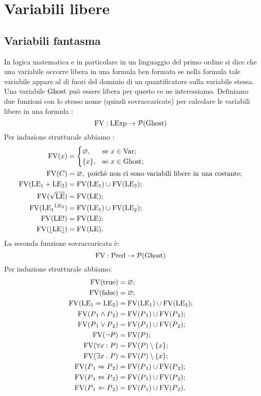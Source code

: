 \documentclass[a4paper, 12pt, oneside,fleqn]{book}
\begin{document}
\chapter{Variabili libere}
\section{Variabili fantasma}
In logica matematica e in particolare in un linguaggio del primo ordine si dice che una variabile occorre libera in una formula ben formata se nella formula tale variabile appare al di fuori del dominio di un quantificatore sulla variabile stessa. Una variabile $\mathrm{Ghost}$ può essere libera per questo ce ne interessiamo.
Definiamo due funzioni con lo stesso nome (quindi sovraccaricate) per calcolare le variabili libere in una formula :
$$\mathrm{FV}\mathrel{:}\mathrm{LExp} \rightarrow \mathcal{P}(\mathrm{Ghost})$$
Per induzione strutturale abbiamo :
\begin{align*}
   \mathrm{FV}(x) 
      &= 
        \begin{cases}
            \varnothing,&\text{se $x  \in \mathrm{Var}$};\\
            \{x\},    &\text{se $x  \in \mathrm{Ghost}$};
        \end{cases} \\
   \mathrm{FV}( C) 
      &= \varnothing,\text{ poichè non ci sono variabili libere in una costante};\\
   \mathrm{FV}(\mathrm{LE}{_1} + \mathrm{LE}{_2}) 
      &= \mathrm{FV}(\mathrm{LE}{_1}) \cup \mathrm{FV}(\mathrm{LE}{_2});\\
   \mathrm{FV}(\sqrt{\mathrm{LE}}) 
      &= \mathrm{FV}(\mathrm{LE});\\
   \mathrm{FV}(\mathrm{LE}{_1}^{\mathrm{LE}_2}) 
      &= \mathrm{FV}(\mathrm{LE}{_1}) \cup \mathrm{FV}(\mathrm{LE}_2);\\
   \mathrm{FV}(\mathrm{LE}!) 
      &= \mathrm{FV}(\mathrm{LE});\\
   \mathrm{FV}(\lfloor \mathrm{LE} \rfloor) 
      &= \mathrm{FV}(\mathrm{LE}).
\end{align*}
La seconda funzione sovraccaricata è:
$$\mathrm{FV}\mathrel{:}\mathrm{Pred}\rightarrow\mathcal{P}(\mathrm{Ghost})$$
Per induzione strutturale abbiamo:
\begin{align*}
   \mathrm{FV}(\mathrm{true}) 
      &= \varnothing;\\
   \mathrm{FV}(\mathrm{false}) 
      &= \varnothing;\\
   \mathrm{FV}(\mathrm{LE}{_1} = \mathrm{LE}{_2}) 
      &= \mathrm{FV}(\mathrm{LE}{_1}) \cup \mathrm{FV}(\mathrm{LE}{_2});\\
   \mathrm{FV}(P{_1} \wedge P{_2}) 
      &= \mathrm{FV}(P{_1}) \cup \mathrm{FV}(P{_2});\\
   \mathrm{FV}(P{_1} \vee P{_2}) 
      &= \mathrm{FV}(P{_1}) \cup \mathrm{FV}(P{_2});\\
   \mathrm{FV}(\neg P) 
      &= \mathrm{FV}(P);\\
   \mathrm{FV}(\forall x \mathrel{:} P) 
      &= \mathrm{FV}(P)\setminus \{x\};\\
   \mathrm{FV}(\exists x \mathrel{.} P) 
      &= \mathrm{FV}(P)\setminus \{x\};\\
   \mathrm{FV}(P{_1} \Rightarrow P{_2}) 
      &= \mathrm{FV}(P{_1}) \cup \mathrm{FV}(P{_2});\\
   \mathrm{FV}(P{_1} \Leftrightarrow P{_2}) 
      &= \mathrm{FV}(P{_1}) \cup \mathrm{FV}(P{_2});\\
   \mathrm{FV}(P{_1} \Leftarrow P{_2}) 
      &= \mathrm{FV}(P{_1}) \cup \mathrm{FV}(P{_2}).
\end{align*}
\end{document}
